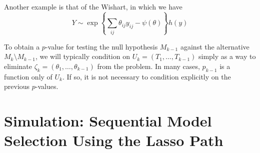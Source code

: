 \documentclass{article}
\begin{document}
Another example is that of the Wishart, in which we have
\begin{equation}
  Y \sim \exp\left\{ \sum_{ij} \theta_{ij}y_{ij} - \psi(\theta)\right\}h(y)
\end{equation}

To obtain a $p$-value for testing the null hypothesis $M_{k-1}$ against the alternative $M_k \setminus M_{k-1}$, we will typically condition on $U_k=(T_1,\ldots, T_{k-1})$ simply as a way to eliminate $\zeta_k=(\theta_1,\ldots, \theta_{k-1})$ from the problem. In many cases, $p_{k-1}$ is a function only of $U_k$. If so, it is not necessary to condition explicitly on the previous $p$-values.


\section{Simulation: Sequential Model Selection Using the Lasso Path}
\end{document}
